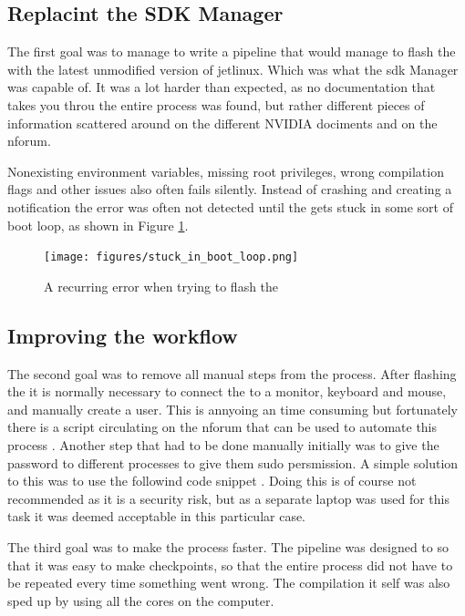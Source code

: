 \subsection{Replacint the SDK Manager}
The first goal was to manage to write a pipeline that would manage to flash the \jx with the latest unmodified version of \gls{jetlinux}.
Which was what the \gls{sdk} Manager was capable of.
It was a lot harder than expected, as no documentation that takes you throu the entire process was found, but rather different pieces of information scattered around on the different NVIDIA dociments and on the \gls{nforum}.

Nonexisting environment variables, missing root privileges, wrong compilation flags and other issues also often fails silently.
Instead of crashing and creating a notification the error was often not detected until the \jx gets stuck in some sort of boot loop, as shown in Figure \ref{fig:stuck_in_boot_loop}.

\begin{figure}[H]
    \centering
    \texttt{[image: figures/stuck\_in\_boot\_loop.png]}
    \caption{A recurring error when trying to flash the \jx}
    \label{fig:stuck_in_boot_loop}
\end{figure}


\subsection{Improving the workflow}
The second goal was to remove all manual steps from the process.
After flashing the \jx it is normally necessary to connect the \jx to a monitor, keyboard and mouse, and manually create a user.
This is annyoing an time consuming but fortunately there is a script circulating on the \gls{nforum} that can be used to automate this process \cite{waynewwwScriptBypassAccountJun2819}.
Another step that had to be done manually initially was to give the password to different processes to give them sudo persmission.
A simple solution to this was to use the followind code snippet .
Doing this is of course not recommended as it is a security risk, but as a separate laptop was used for this task it was deemed acceptable in this particular case.

The third goal was to make the process faster.
The pipeline was designed to so that it was easy to make checkpoints, so that the entire process did not have to be repeated every time something went wrong.
The compilation it self was also sped up by using all the cores on the computer.

